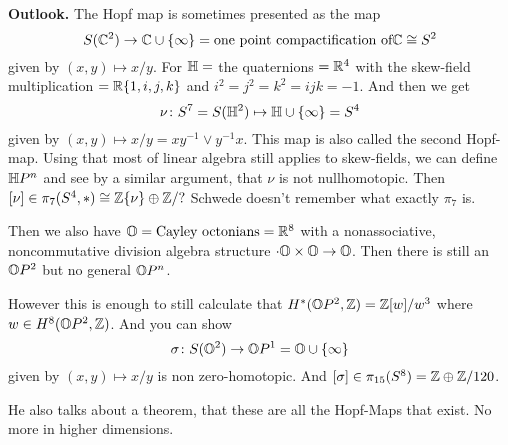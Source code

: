 \documentclass[language=english]{TemplateLecture}
\begin{document}
\textbf{Outlook.} The Hopf map is sometimes presented as the map
\[S(\mathbb{C}^2) \to \mathbb{C} \cup \{\infty\} = \text{one point compactification of} \mathbb{C} \cong S^2\]
given by \((x,y) \mapsto x/y\). For \(\mathbb{H} =\) the quaternions \(= \mathbb{R}^4\) with the skew-field multiplication \(= \mathbb{R}\{1,i,j,k\}\) and \(i^2 = j^2 = k^2 = ijk = -1\). And then we get
\[\nu \colon S^7 = S(\mathbb{H}^2) \mapsto \mathbb{H} \cup \{\infty\} = S^4\]
given by \((x,y) \mapsto x/y = xy^{-1} \vee y^{-1}x\). This map is also called the second Hopf-map. Using that most of linear algebra still applies to skew-fields, we can define \(\mathbb{H} P^n\) and see by a similar argument, that \(\nu\) is not nullhomotopic. Then \([\nu] \in \pi_7(S^4, *) \cong \mathbb{Z}\{\nu\} \oplus \mathbb{Z}/?\)
Schwede doesn't remember what exactly \(\pi_7\) is.

Then we also have \(\mathbb{O} = \text{Cayley octonians} = \mathbb{R}^8\) with a nonassociative, noncommutative division algebra structure \(\cdot \mathbb{O} \times \mathbb{O} \to \mathbb{O}\). Then there is still an \(\mathbb{O} P^2\) but no general \(\mathbb{O} P^n\).

However this is enough to still calculate that \(H^*(\mathbb{O} P^2, \mathbb{Z}) = \mathbb{Z}[w]/w^3\) where \(w \in H^8(\mathbb{O} P^2, \mathbb{Z})\). And you can show
\[\sigma \colon S(\mathbb{O}^2) \to \mathbb{O} P^1 = \mathbb{O} \cup \{\infty\}\]
given by \((x,y) \mapsto x/y\) is non zero-homotopic. And \([\sigma] \in \pi_{15}(S^8) = \mathbb{Z} \oplus \mathbb{Z}/120\).

He also talks about a theorem, that these are all the Hopf-Maps that exist. No more in higher dimensions.
\end{document}
